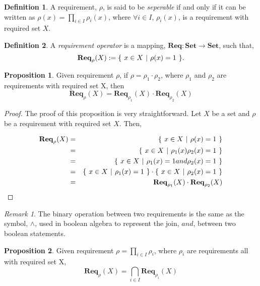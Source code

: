 \documentclass{article}
\theoremstyle{definition}
\newtheorem{definition}{Definition}[section]
\theoremstyle{remark}
\newtheorem*{remark}{Remark}
\theoremstyle{theorem}
\theoremstyle{definition}
\newtheorem{proposition}{Proposition}[section]
\newcommand{\reqop}[2]{\mathbf{Req}_{#1}(#2)}
\newcommand{\setbuild}[3]{
	\{\hspace{0.05in} 
	#1 \in #2 \hspace{0.05in} 
	| \hspace{0.05in}#3\hspace{0.05in}
	\}	
}
\begin{document}
		\begin{definition}
			A requirement, $\rho$, is said to be \emph{seperable} if and only if it can be written as $\rho(x) = \prod_{i \in I}{\rho_{i}(x)}$, where $\forall i \in I$, $\rho_{i}(x)$, is a requirement with required set $X$.
		\end{definition}
	
		\begin{definition}
			A \emph{requirement operator} is a mapping, $\mathbf{Req}: \mathbf{Set} \rightarrow \mathbf{Set}$,
			such that,
			\[
			\reqop{\rho}{X} := \setbuild{x}{X}{\rho(x) = 1}.
			\]
		\end{definition}
	
		\begin{proposition}
			Given requirement $\rho$, if $\rho = \rho_{1}\cdot\rho_{2}$, where $\rho_{1}$ and $\rho_{2}$ are requirements with required set X, then  
			\[
			\reqop{\rho}{X} = \reqop{\rho_{1}}{X}\cdot\reqop{\rho_{2}}{X}
			\]
		\end{proposition}
	
		\begin{proof}
			The proof of this proposition is very straightforward. Let $X$ be a set and $\rho$ be a requirement with required set $X$. Then,
			
			\begin{eqnarray}
			\reqop{\rho}{X} & = & \setbuild{x}{X}{\rho(x) = 1} \\
			                & = & \setbuild{x}{X}{\rho_{1}(x)\rho_{2}(x) = 1} \\
			                & = & \setbuild{x}{X}{\rho_{1}(x) = 1 and \rho_{2}(x) = 1} \\
							& = & \setbuild{x}{X}{\rho_{1}(x) = 1}\cdot\setbuild{x}{X}{\rho_{2}(x) = 1} \\
							& = & \reqop{\rho_{1}}{X}\cdot\reqop{\rho_{2}}{X} 
			\end{eqnarray}
		
		\end{proof}
	
		\begin{remark}
			The binary operation between two requirements is the same as the symbol, $\wedge$, used in boolean algebra to represent the join, $and$, between two boolean statements. 
		\end{remark}
	
		\begin{proposition}
			Given requirement $\rho = \prod_{i \in I}{\rho_{i}}$, where $\rho_{i}$ are requirements all with required set X,  
			\[
			\reqop{\rho}{X} = \bigcap_{i \in I}{\reqop{\rho_{i}}{X}}
			\]
			 
		\end{proposition}
	
\end{document}
